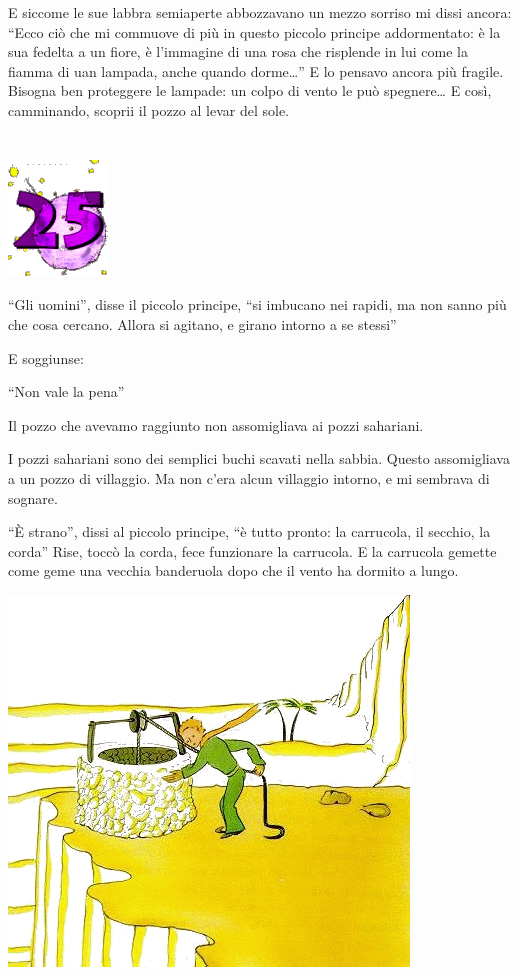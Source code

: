 \documentclass[11pt]{scrbook}
\begin{document}
E siccome le sue labbra semiaperte abbozzavano un mezzo sorriso mi dissi ancora: ``Ecco ciò che mi commuove di più in questo piccolo principe addormentato: è la sua fedelta a un fiore, è l'immagine di una rosa che risplende in lui come la fiamma di uan lampada, anche quando dorme\ldots{}'' E lo pensavo ancora più fragile. Bisogna ben proteggere
le lampade: un colpo di vento le può spegnere\ldots{} E così, camminando, scoprii il pozzo al levar del sole.

\chapter{}
\begin{center}
\includegraphics{img/chapter25}
\end{center}

``Gli uomini'', disse il piccolo principe, ``si imbucano nei rapidi, ma non sanno più che cosa cercano. Allora si agitano, e girano intorno a se stessi''

E soggiunse:

``Non vale la pena''

Il pozzo che avevamo raggiunto non assomigliava ai pozzi sahariani.

I pozzi sahariani sono dei semplici buchi scavati nella sabbia. Questo assomigliava a un pozzo di villaggio. Ma non c'era alcun villaggio intorno, e mi sembrava di sognare.

``È strano'', dissi al piccolo principe, ``è tutto pronto: la carrucola, il secchio, la corda'' Rise, toccò la corda, fece funzionare la carrucola. E la carrucola gemette come geme una vecchia banderuola dopo che il vento ha dormito a lungo.

\begin{center}
\includegraphics{img/25a}
\end{center}
\end{document}
